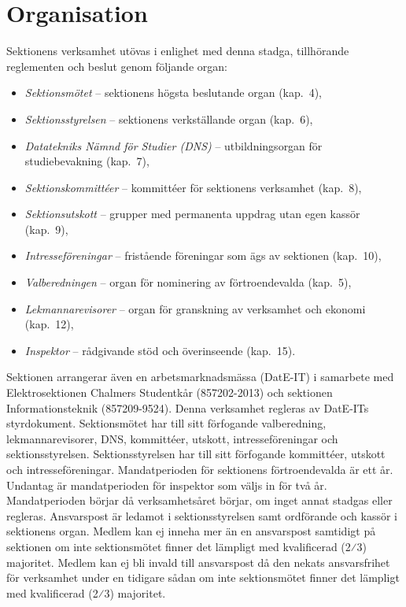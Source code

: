\documentclass[a4paper]{dteklag}
\begin{document}
\section{Organisation}
 Sektionens verksamhet utövas i enlighet med denna stadga, tillhörande reglementen och beslut genom följande organ:
\begin{itemize}\setlength\itemsep{0em}
\item \textit{Sektionsmötet} – sektionens högsta beslutande organ (kap.~4),
\item \textit{Sektionsstyrelsen} – sektionens verkställande organ (kap.~6),
\item \textit{Datatekniks Nämnd för Studier (DNS)} – utbildningsorgan för studiebevakning (kap.~7),
\item \textit{Sektionskommittéer} – kommittéer för sektionens verksamhet (kap.~8),
\item \textit{Sektionsutskott} – grupper med permanenta uppdrag utan egen kassör (kap.~9),
\item \textit{Intresseföreningar} – fristående föreningar som ägs av sektionen (kap.~10),
\item \textit{Valberedningen} – organ för nominering av förtroendevalda (kap.~5),
\item \textit{Lekmannarevisorer} – organ för granskning av verksamhet och ekonomi (kap.~12),
\item \textit{Inspektor} – rådgivande stöd och överinseende (kap.~15).
\end{itemize}
\stycke Sektionen arrangerar även en arbetsmarknadsmässa (DatE-IT) i samarbete med Elektrosektionen Chalmers Studentkår (857202-2013) och sektionen Informationsteknik (857209-9524). Denna verksamhet regleras av DatE-ITs styrdokument. 
\para[Ansvarsförhållanden] Sektionsmötet har till sitt förfogande valberedning, lekmannarevisorer, DNS, kommittéer, utskott, intresseföreningar och sektionsstyrelsen.
\para Sektionsstyrelsen har till sitt förfogande kommittéer, utskott och intresseföreningar.
\para [Mandatperiod] Mandatperioden för sektionens förtroendevalda är ett år. 
\stycke Undantag är mandatperioden för inspektor som väljs in för två år.
\para Mandatperioden börjar då verksamhetsåret börjar, om inget annat stadgas eller regleras.
\para[Ansvarspost] Ansvarspost är ledamot i sektionsstyrelsen samt ordförande och kassör i sektionens organ.
\para Medlem kan ej inneha mer än en ansvarspost samtidigt på sektionen om inte sektionsmötet finner det lämpligt med kvalificerad (2⁄3) majoritet.
\para Medlem kan ej bli invald till ansvarspost då den nekats ansvarsfrihet för verksamhet under en tidigare sådan om inte sektionsmötet finner det lämpligt med kvalificerad (2⁄3) majoritet.
\end{document}
